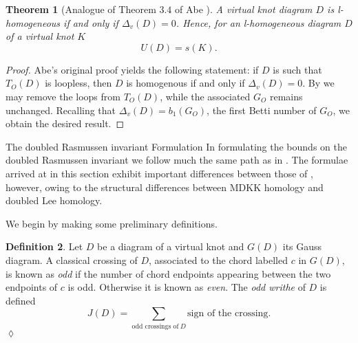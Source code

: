 \documentclass[10pt,oneside]{amsart}
\newtheorem{theorem}{Theorem}[section]
\theoremstyle{definition}
\newtheorem{definition}[theorem]{Definition}
\numberwithin{equation}{section}
\DeclareRobustCommand{\CloseDef}{	\leavevmode\unskip\penalty9999 \hbox{}\nobreak\hfill
	\quad\hbox{$\lozenge$}}
\begin{document}
\begin{theorem}[Analogue of Theorem \( 3.4 \) of Abe \cite{Abe2011}]
	\label{Thm:deltazero}
	A virtual knot diagram \( D \) is l-homogeneous if and only if \( \Delta_v ( D ) = 0 \). Hence, for an l-homogeneous diagram \( D \) of a virtual knot \( K \)
	\begin{equation*}
		U ( D ) = s ( K ).
	\end{equation*}
\end{theorem}

\begin{proof}
	Abe's original proof yields the following statement: if \( D \) is such that \( T_O ( D ) \) is loopless, then \( D \) is homogenous if and only if \( \Delta_v ( D ) = 0 \). By  we may remove the loops from \( T_O ( D ) \), while the associated \( G_{O} \) remains unchanged. Recalling that \( \Delta_v ( D ) = b_1 ( G_O ) \), the first Betti number of \( G_O \), we obtain the desired result.
\end{proof}

{		{\normalfont\bfseries\large}}{The doubled Rasmussen invariant}
\label{Subsec:doubledbounds}
{		{\normalfont\bfseries}}{Formulation}
\label{Subsec:doubledform}
In formulating the bounds on the doubled Rasmussen invariant we follow much the same path as in . The formulae arrived at in this section exhibit important differences between those of , however, owing to the structural differences between MDKK homology and doubled Lee homology.

We begin by making some preliminary definitions.

\begin{definition}
	Let \( D \) be a diagram of a virtual knot and \( G ( D ) \) its Gauss diagram. A classical crossing of \( D \), associated to the chord labelled \(c\) in \( G ( D ) \), is known as \emph{odd} if the number of chord endpoints appearing between the two endpoints of \( c \) is odd. Otherwise it is known as \emph{even}. The \emph{odd writhe} of \( D \) is defined
	\begin{equation*}
	J ( D ) = \sum_{\text{odd crossings of}~D} \text{sign of the crossing}.
	\end{equation*}\CloseDef
\end{definition}
\end{document}
